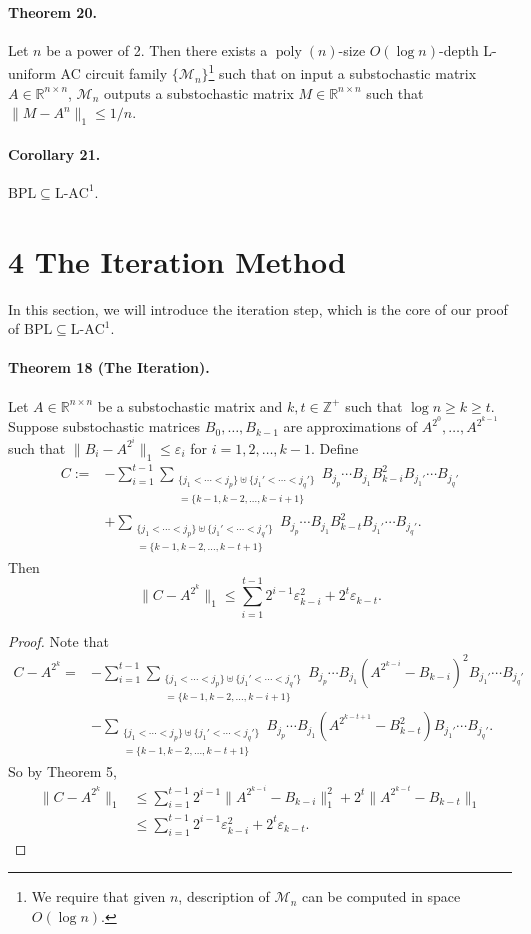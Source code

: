 \paragraph{Theorem 20.} Let $n$ be a power of 2. Then there exists a $\operatorname{poly}(n)$-size $O(\log n)$-depth L-uniform AC circuit family $\{\mathcal M_n\}$\footnote{We require that given $n$, description of $\mathcal M_n$ can be computed in space $O(\log n)$.} such that on input a substochastic matrix $A\in\mathbb R^{n\times n}$, $\mathcal M_n$ outputs a substochastic matrix $M\in\mathbb R^{n\times n}$ such that $\|M-A^n\|_1\le1/n$.
\paragraph{Corollary 21.} $\mathrm{BPL}\subseteq\mathrm{L}\text{-}\mathrm{AC}^1$.
\section*{4 The Iteration Method}
In this section, we will introduce the iteration step, which is the core of our proof of $\mathrm{BPL}\subseteq\mathrm{L}\text{-}\mathrm{AC}^1$.
\paragraph{Theorem 18 (The Iteration).} Let $A\in\mathbb R^{n\times n}$ be a substochastic matrix and $k,t\in\mathbb Z^+$ such that $\log n\ge k\ge t$. Suppose substochastic matrices $B_0,\ldots,B_{k-1}$ are approximations of $A^{2^0},\ldots,A^{2^{k-1}}$ such that $\|B_i-A^{2^i}\|_1\le\varepsilon_i$ for $i=1,2,\ldots,k-1$. Define
\begin{align*}
C:=&-\sum_{i=1}^{t-1}\sum_{\substack{\{j_1<\cdots<j_p\}\uplus\{j_1'<\cdots<j_q'\}\\=\{k-1,k-2,\ldots,k-i+1\}}}B_{j_p}\cdots B_{j_1}B_{k-i}^2 B_{j_1'}\cdots B_{j_q'}\\
&+\sum_{\substack{\{j_1<\cdots<j_p\}\uplus\{j_1'<\cdots<j_q'\}\\=\{k-1,k-2,\ldots,k-t+1\}}}B_{j_p}\cdots B_{j_1}B_{k-t}^2 B_{j_1'}\cdots B_{j_q'}.
\end{align*}
Then
\[\|C-A^{2^k}\|_1\le\sum_{i=1}^{t-1}2^{i-1}\varepsilon_{k-i}^2+2^t\varepsilon_{k-t}.\]
\begin{proof}
Note that
\begin{align*}
C-A^{2^k}=&-\sum_{i=1}^{t-1}\sum_{\substack{\{j_1<\cdots<j_p\}\uplus\{j_1'<\cdots<j_q'\}\\=\{k-1,k-2,\ldots,k-i+1\}}}B_{j_p}\cdots B_{j_1}(A^{2^{k-i}}-B_{k-i})^2B_{j_1'}\cdots B_{j_q'}\\
&-\sum_{\substack{\{j_1<\cdots<j_p\}\uplus\{j_1'<\cdots<j_q'\}\\=\{k-1,k-2,\ldots,k-t+1\}}}B_{j_p}\cdots B_{j_1}(A^{2^{k-t+1}}-B_{k-t}^2)B_{j_1'}\cdots B_{j_q'}.
\end{align*}
So by Theorem 5,
\begin{align*}\|C-A^{2^k}\|_1&\le\sum_{i=1}^{t-1}2^{i-1}\|A^{2^{k-i}}-B_{k-i}\|_1^2+2^t\|A^{2^{k-t}}-B_{k-t}\|_1\\&\le\sum_{i=1}^{t-1}2^{i-1}\varepsilon_{k-i}^2+2^t\varepsilon_{k-t}.\end{align*}
\end{proof}
